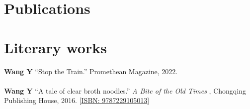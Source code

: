 \documentclass[letterpaper,10pt]{article}
\begin{document}
\section{Publications}


\nocite{*}

\printbibliography[heading=none]






\section{Literary works}
\textbf{Wang Y} ``Stop the Train.'' Promethean Magazine, 2022.\\\\
\textbf{Wang Y} ``A tale of clear broth noodles.'' \textit{A Bite of the Old Times }, Chongqing Publishing House, 2016. [\url{ISBN: 9787229105013}]
\end{document}
